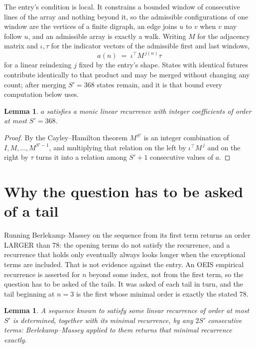 \documentclass[11pt,a4paper]{article}
\theoremstyle{plain}
\newtheorem{lemma}[theorem]{Lemma}
\theoremstyle{definition}
\begin{document}
The entry's condition is local. It constrains a bounded window of consecutive lines of the
array and nothing beyond it, so the admissible configurations of one window are the vertices of
a finite digraph, an edge joins $u$ to $v$ when $v$ may follow $u$, and an admissible array is
exactly a walk. Writing $M$ for the adjacency matrix and $\iota,\tau$ for the indicator vectors
of the admissible first and last windows,
\[
a(n)\;=\;\iota^{\!\top}M^{\,j(n)}\tau
\]
for a linear reindexing $j$ fixed by the entry's shape. States with identical futures
contribute identically to that product and may be merged without changing any count; after
merging $S'=368$ states remain, and it is that bound every computation below uses.

\begin{lemma}\label{lem:cf}
$a$ satisfies a monic linear recurrence with integer coefficients of order at most $S'=368$.
\end{lemma}

\begin{proof}
By the Cayley--Hamilton theorem $M^{S'}$ is an integer combination of $I,M,\dots,M^{S'-1}$,
and multiplying that relation on the left by $\iota^{\!\top}M^{\,j}$ and on the right by
$\tau$ turns it into a relation among $S'+1$ consecutive values of $a$.
\end{proof}

\section{Why the question has to be asked of a tail}

Running Berlekamp--Massey on the sequence from its first term returns an order LARGER than $78$: the opening terms do not satisfy the recurrence, and a recurrence that holds only eventually always looks longer when the exceptional terms are included. That is not evidence against the entry. An OEIS empirical recurrence is asserted for $n$ beyond some index, not from the first term, so the question has to be asked of the tails. It was asked of each tail in turn, and the tail beginning at $n=3$ is the first whose minimal order is exactly the stated $78$.

\begin{lemma}\label{lem:bm}
A sequence known to satisfy some linear recurrence of order at most $S'$ is determined,
together with its minimal recurrence, by any $2S'$ consecutive terms: Berlekamp--Massey applied
to them returns that minimal recurrence exactly.
\end{lemma}
\end{document}
